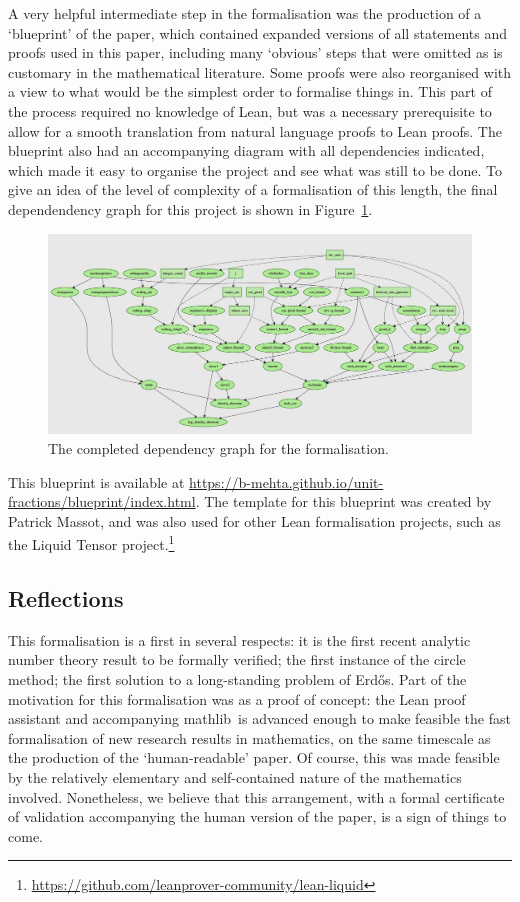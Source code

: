 \documentclass[12pt]{amsart}
\newcommand{\mathlib}{\textsf{mathlib}}
\begin{document}
A very helpful intermediate step in the formalisation was the production of a `blueprint' of the paper, which contained expanded versions of all statements and proofs used in this paper, including many `obvious' steps that were omitted as is customary in the mathematical literature. Some proofs were also reorganised with a view to what would be the simplest order to formalise things in. This part of the process required no knowledge of Lean, but was a necessary prerequisite to allow for a smooth translation from natural language proofs to Lean proofs. The blueprint also had an accompanying diagram with all dependencies indicated, which made it easy to organise the project and see what was still to be done. To give an idea of the level of complexity of a formalisation of this length, the final dependendency graph for this project is shown in Figure~\ref{fig1}.

\begin{figure}
\includegraphics[scale=0.2]{blueprint}
\caption{The completed dependency graph for the formalisation.}\label{fig1}
\end{figure}

This blueprint is available at \url{https://b-mehta.github.io/unit-fractions/blueprint/index.html}. The template for this blueprint was created by Patrick Massot, and was also used for other Lean formalisation projects, such as the Liquid Tensor project.\footnote{\url{https://github.com/leanprover-community/lean-liquid}}

\subsection{Reflections} This formalisation is a first in several respects: it is the first recent analytic number theory result to be formally verified; the first instance of the circle method; the first solution to a long-standing problem of Erd\H{o}s.  Part of the motivation for this formalisation was as a proof of concept: the Lean proof assistant and accompanying \mathlib\ is advanced enough to make feasible the fast formalisation of new research results in mathematics, on the same timescale as the production of the `human-readable' paper. Of course, this was made feasible by the relatively elementary and self-contained nature of the mathematics involved. Nonetheless, we believe that this arrangement, with a formal certificate of validation accompanying the human version of the paper, is a sign of things to come. 
\end{document}
